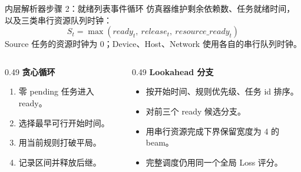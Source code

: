 \documentclass[aspectratio=169]{ctexbeamer}
\begin{document}
\begin{frame}{内层解析器步骤 2：就绪列表事件循环}
  \small
  仿真器维护剩余依赖数、任务就绪时间，以及三类串行资源队列时钟：
  \[
    S_t=\max(ready_t,\ release_t,\ resource\_ready_t)
  \]
  Source 任务的资源时钟为 0；Device、Host、Network 使用各自的串行队列时钟。

  \begin{columns}[T,onlytextwidth]
    \begin{column}{0.49\textwidth}
      \textbf{贪心循环}
      \begin{enumerate}
        \item 零 pending 任务进入 ready。
        \item 选择最早可行开始时间。
        \item 用当前规则打破平局。
        \item 记录区间并释放后继。
      \end{enumerate}
    \end{column}
    \begin{column}{0.49\textwidth}
      \textbf{Lookahead 分支}
      \begin{itemize}
        \item 按开始时间、规则优先级、任务 id 排序。
        \item 对前三个 ready 候选分支。
        \item 用串行资源完成下界保留宽度为 4 的 beam。
        \item 完整调度仍用同一个全局 Loss 评分。
      \end{itemize}
    \end{column}
  \end{columns}
\end{frame}
\end{document}
